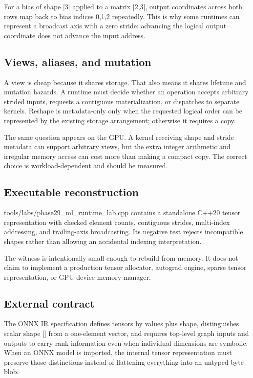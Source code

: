 For a bias of shape {[}3{]} applied to a matrix {[}2,3{]}, output coordinates across both rows map back to bias indices 0,1,2 repeatedly. This is why some runtimes can represent a broadcast axis with a zero stride: advancing the logical output coordinate does not advance the input address.

\subsection{Views, aliases, and mutation}\label{views-aliases-and-mutation}

A view is cheap because it shares storage. That also means it shares lifetime and mutation hazards. A runtime must decide whether an operation accepts arbitrary strided inputs, requests a contiguous materialization, or dispatches to separate kernels. Reshape is metadata-only only when the requested logical order can be represented by the existing storage arrangement; otherwise it requires a copy.

The same question appears on the GPU. A kernel receiving shape and stride metadata can support arbitrary views, but the extra integer arithmetic and irregular memory access can cost more than making a compact copy. The correct choice is workload-dependent and should be measured.

\subsection{Executable reconstruction}\label{executable-reconstruction}

tools/labs/phase29\_ml\_runtime\_lab.cpp contains a standalone C++20 tensor representation with checked element counts, contiguous strides, multi-index addressing, and trailing-axis broadcasting. Its negative test rejects incompatible shapes rather than allowing an accidental indexing interpretation.

The witness is intentionally small enough to rebuild from memory. It does not claim to implement a production tensor allocator, autograd engine, sparse tensor representation, or GPU device-memory manager.

\subsection{External contract}\label{external-contract}

The ONNX IR specification defines tensors by values plus shape, distinguishes scalar shape {[}{]} from a one-element vector, and requires top-level graph inputs and outputs to carry rank information even when individual dimensions are symbolic. When an ONNX model is imported, the internal tensor representation must preserve those distinctions instead of flattening everything into an untyped byte blob.

